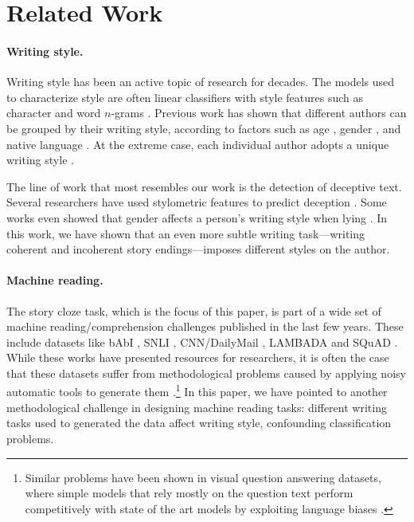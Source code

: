 \documentclass[11pt,a4paper]{article}
\newcommand{\isection}[2]{\section{#1}\label{ssec:#2}}
\begin{document}
\isection{Related Work}{Related}

\paragraph{Writing style.}
Writing style has been an active topic of research for decades. 
The models used to characterize style are often linear classifiers with style features such as character and word $n$-grams \cite{Stamatatos:2009,Koppel:2009}.
Previous work has shown that different authors can be grouped by their
writing style, according to factors such as age
\cite{Pennebaker:2003,Argamon:2003,Schler:2006,Rosenthal:2011,nguyen:2011:latech},
gender \cite{Argamon:2003,Schler:2006,bamman2014gender}, and native language
\cite{Koppel:2005,Tsur:2007,Bergsma:2012}.
At the extreme case, each individual author adopts a unique writing
style \cite{mosteller1963inference,pennebaker1999linguistic,Schwartz:2013}. 

The line of work that most resembles our work is the detection of deceptive text. 
Several researchers have used stylometric features to  predict deception 
\cite{Newman:2003,hancock2007lying,ott2011finding,Feng:2012}.
Some works even showed that gender affects a person's  writing style when lying \cite{Perez:2014b,Perez:2014a}.
In this work, we have shown that an even more subtle writing task---writing {coherent} and {incoherent} story endings---imposes different styles on the author.


\paragraph{Machine reading.}
The  story cloze task, which is the focus of this paper, is part of a wide set of machine reading/comprehension challenges published in the last few years.
These include datasets like bAbI \cite{Weston:2015}, SNLI \cite{bowman2015large}, CNN/DailyMail \cite{hermann2015teaching}, LAMBADA \cite{Paperno:2016} and SQuAD \cite{rajpurkar2016squad}. 
While these works have presented resources for researchers, 
it is often the case that these datasets suffer from methodological
problems caused by applying noisy automatic tools to generate them \cite{Chen:2016}.\footnote{Similar problems have been shown in visual question answering datasets, where simple models that rely mostly on the question text perform competitively with state of the art models by exploiting language biases \cite{Zhou:2015,Jabri:2016}.}
In this paper, we have pointed to another methodological challenge in
designing machine reading tasks:  different writing tasks
used to generated the data affect writing style, confounding classification problems.
\end{document}
